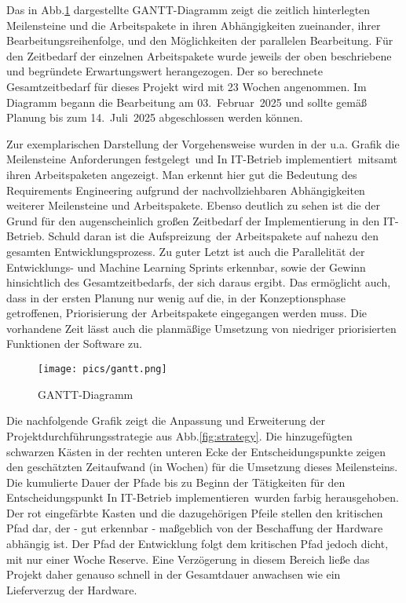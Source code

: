 Das in Abb.\ref{fig:gantt} dargestellte GANTT-Diagramm zeigt die zeitlich hinterlegten Meilensteine und die Arbeitspakete in ihren Abhängigkeiten zueinander, ihrer Bearbeitungsreihenfolge, und den Möglichkeiten der parallelen Bearbeitung. Für den Zeitbedarf der einzelnen Arbeitspakete wurde jeweils der oben beschriebene und begründete Erwartungswert herangezogen. Der so berechnete Gesamtzeitbedarf für dieses Projekt wird mit 23 Wochen angenommen. Im Diagramm begann die Bearbeitung am 03.~Februar~2025 und sollte gemäß Planung bis zum 14.~Juli~2025 abgeschlossen werden können. 

Zur exemplarischen Darstellung der Vorgehensweise wurden in der u.a. Grafik die Meilensteine \glqq Anforderungen festgelegt\grqq\ und \glqq In IT-Betrieb implementiert\grqq\ mitsamt ihren Arbeitspaketen angezeigt. Man erkennt hier gut die Bedeutung des Requirements Engineering aufgrund der nachvollziehbaren Abhängigkeiten weiterer Meilensteine und Arbeitspakete. Ebenso deutlich zu sehen ist die der Grund für den augenscheinlich großen Zeitbedarf der Implementierung in den IT-Betrieb. Schuld daran ist die \glqq Aufspreizung\grqq\ der Arbeitspakete auf nahezu den gesamten Entwicklungsprozess. Zu guter Letzt ist auch die Parallelität der Entwicklungs- und Machine Learning Sprints erkennbar, sowie der Gewinn hinsichtlich des Gesamtzeitbedarfs, der sich daraus ergibt. Das ermöglicht auch, dass in der ersten Planung nur wenig auf die, in der Konzeptionsphase getroffenen,  Priorisierung der Arbeitspakete eingegangen werden muss. Die vorhandene Zeit lässt auch die planmäßige Umsetzung von niedriger priorisierten Funktionen der Software zu.

\begin{figure}[h]
\centering
\texttt{[image: pics/gantt.png]}
\caption{GANTT-Diagramm} 
\label{fig:gantt}
\end{figure}

\FloatBarrier
Die nachfolgende Grafik zeigt die Anpassung und Erweiterung der Projektdurchführungsstrategie aus Abb.\ref{fig:strategy}. Die hinzugefügten schwarzen Kästen in der rechten unteren Ecke der Entscheidungspunkte zeigen den geschätzten Zeitaufwand (in Wochen) für die Umsetzung dieses Meilensteins. Die kumulierte Dauer der Pfade bis zu Beginn der Tätigkeiten für den Entscheidungspunkt \glqq In IT-Betrieb implementieren\grqq\ wurden farbig herausgehoben. Der rot eingefärbte Kasten und die dazugehörigen Pfeile stellen den kritischen Pfad dar, der - gut erkennbar - maßgeblich von der Beschaffung der Hardware abhängig ist. Der Pfad der Entwicklung folgt dem kritischen Pfad jedoch dicht, mit nur einer Woche Reserve. Eine Verzögerung in diesem Bereich ließe das Projekt daher genauso schnell in der Gesamtdauer anwachsen wie ein Lieferverzug der Hardware.

